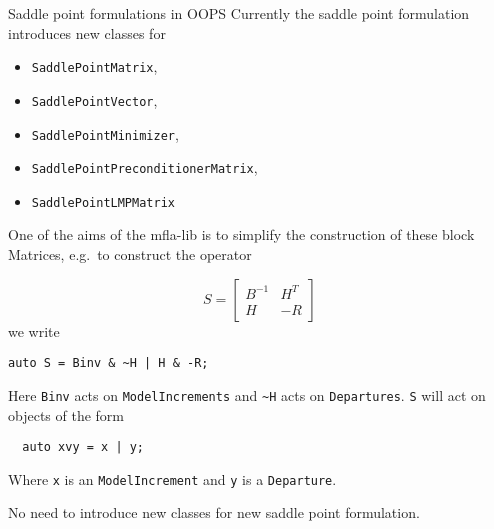\documentclass[9pt]{beamer}
\begin{document}
\begin{frame}[fragile]{Saddle point formulations in OOPS}
Currently the saddle point formulation introduces new classes for
\begin{itemize}
  \item \lstinline|SaddlePointMatrix|,
  \item \lstinline|SaddlePointVector|,
  \item \lstinline|SaddlePointMinimizer|,
  \item \lstinline|SaddlePointPreconditionerMatrix|,
  \item \lstinline|SaddlePointLMPMatrix|
\end{itemize}
One of the aims of the mfla-lib is to simplify the construction of these block Matrices, e.g.\ to construct the operator

$$S = \begin{bmatrix}  B^{-1} & H^T \\  H &  -R\end{bmatrix} $$
we write

\begin{lstlisting}
auto S = Binv & ~H | H & -R;
\end{lstlisting}


Here \lstinline|Binv| acts on \lstinline|ModelIncrements| and \lstinline|~H| acts on \lstinline|Departures|. \lstinline|S|  will act on objects of the form
\begin{lstlisting}
  auto xvy = x | y;
  \end{lstlisting}

Where \lstinline|x| is an \lstinline|ModelIncrement| and \lstinline|y| is a \lstinline|Departure|.

No need to introduce new classes for new saddle point formulation.
\end{frame}
\end{document}
